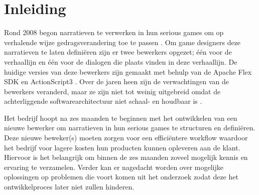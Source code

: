 \chapter{Inleiding}

Rond 2008 begon \organisation{} narratieven te verwerken in hun serious games om op
verhalende wijze gedragsverandering toe te passen \cite{interviewivo}. Om game designers deze
narratieven te laten definiëren zijn er twee bewerkers opgezet; één voor de verhaallijn en één voor de dialogen die plaats vinden in deze verhaallijn. De huidige
versies van deze bewerkers zijn gemaakt met behulp van de Apache Flex SDK
en ActionScript3 \cite{interviewivo}. Over de jaren heen zijn de verwachtingen van de bewerkers veranderd, maar ze zijn niet tot weinig uitgebreid omdat de achterliggende
softwarearchitectuur niet schaal- en houdbaar is \cite{interviewivo}. %



Het bedrijf hoopt na zes maanden te beginnen met het ontwikkelen van een nieuwe bewerker om narratieven in hun serious games te structuren en definiëren.
Deze nieuwe beweker(s) moeten zorgen voor een efficiëntere workflow waardoor het bedrijf voor lagere kosten hun producten kunnen opleveren aan de klant.
Hiervoor is het belangrijk om binnen de zes maanden zoveel mogelijk kennis en ervaring te verzamelen. %
Verder kan er nagedacht worden over mogelijke oplossingen op problemen die voort komen uit het onderzoek zodat deze het ontwikkelproces later niet zullen hinderen.


